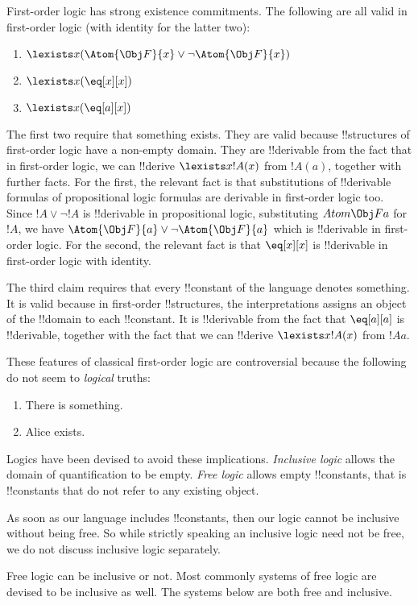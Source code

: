 \documentclass[../../../include/open-logic-section]{subfiles}
\begin{document}


First-order logic has strong existence commitments. The following
are all valid in first-order logic (with identity for the latter two):

\begin{enumerate} 
	\item $\lexists x (\Atom{\Obj F}{x} \lor \lnot \Atom{\Obj F}{x})$ 
	\item $\lexists x (\eq[x][x])$ 
	\item $\lexists x (\eq[a][x])$ 
\end{enumerate}

The first two require that something exists. They are valid because
!!{structure}s of first-order logic have a non-empty domain. They are !!{derivable} from the fact that in first-order logic, we can !!{derive} $\lexists x !A(x)$ from $!A(a)$, together with further facts. For the first, the relevant fact is that substitutions of !!{derivable} formulas of propositional logic formulas are derivable in first-order logic too. Since $!A \lor \lnot !A$ is !!{derivable} in propositional logic, substituting $Atom{\Obj F}{a}$ for $!A$, we have $\Atom{\Obj F}{a} \lor \lnot \Atom{\Obj F}{a}$ which is !!{derivable} in first-order logic. For the second, the relevant fact is that $\eq[x][x]$ is !!{derivable} in first-order logic with identity. 

The third claim requires that every !!{constant} of the language denotes something. It is valid because in first-order !!{structure}s, the interpretations assigns an object of the !!{domain} to each !!{constant}. It is !!{derivable} from the fact that $\eq[a][a]$ is !!{derivable}, together with the fact that we can !!{derive} $\lexists x !A(x)$ from $!A{a}$.

These features of classical first-order logic are controversial because the following do not seem to \emph{logical} truths:

\begin{enumerate}
	\item There is something.
	\item Alice exists. 
\end{enumerate}

Logics have been devised to avoid these implications. \emph{Inclusive logic} allows the domain of quantification to be empty. \emph{Free logic} allows empty !!{constant}s, that is !!{constant}s that do not refer to any existing object.

As soon as our language includes !!{constant}s, then our logic cannot be inclusive without
 being free. So while strictly speaking an inclusive logic need not be free, we do not
 discuss inclusive logic separately.

Free logic can be inclusive or not. Most commonly systems of free logic are devised to
be inclusive as well. The systems below are both free and inclusive. 
\end{document}
